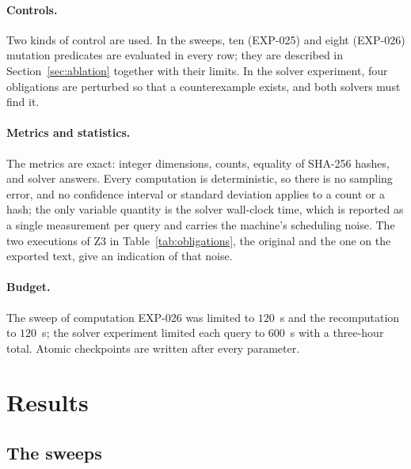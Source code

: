 \documentclass[11pt]{article}
\theoremstyle{definition}
\theoremstyle{remark}
\begin{document}
\paragraph{Controls.} Two kinds of control are used. In the sweeps, ten (EXP-025) and eight
(EXP-026) mutation predicates are evaluated in every row; they are described in
Section~\ref{sec:ablation} together with their limits. In the solver experiment, four obligations
are perturbed so that a counterexample exists, and both solvers must find it.

\paragraph{Metrics and statistics.} The metrics are exact: integer dimensions, counts, equality of
SHA-256 hashes, and solver answers. Every computation is deterministic, so there is no
sampling error, and no confidence interval or standard deviation applies to a count or a
hash; the only variable quantity is the solver wall-clock time, which is reported as a single
measurement per query and carries the machine's scheduling noise. The two executions of Z3 in
Table~\ref{tab:obligations}, the original and the one on the exported text, give an indication of
that noise.

\paragraph{Budget.} The sweep of computation EXP-026 was limited to $120$~s and the
recomputation to $120$~s; the solver experiment limited each query to $600$~s with a three-hour
total. Atomic checkpoints are written after every parameter.

\begin{table}[ht]
\centering
\small
\resizebox{\textwidth}{!}{}
\caption{Hash-checked premise files of the sweeps (SHA-256, full digests, read from the
artifact of computation EXP-026). A sweep refuses to run when any of the four hashes differs
from the value recorded when the experiment was designed.}
\label{tab:premises}
\end{table}

\section{Results}\label{sec:results}

\subsection{The sweeps}
\end{document}
